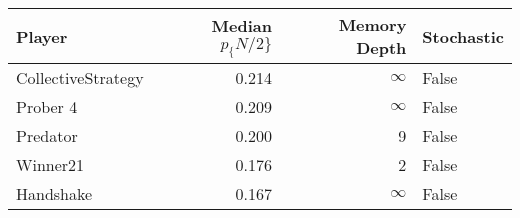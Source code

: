 \begin{tabular}{lrrl}
\toprule
             Player &  Median $p_\{N/2\}$ &  Memory Depth & Stochastic \\
\midrule
 CollectiveStrategy &             0.214 &            \(\infty\) &      False \\
           Prober 4 &             0.209 &            \(\infty\) &      False \\
           Predator &             0.200 &             9 &      False \\
           Winner21 &             0.176 &             2 &      False \\
          Handshake &             0.167 &            \(\infty\) &      False \\
\bottomrule
\end{tabular}
